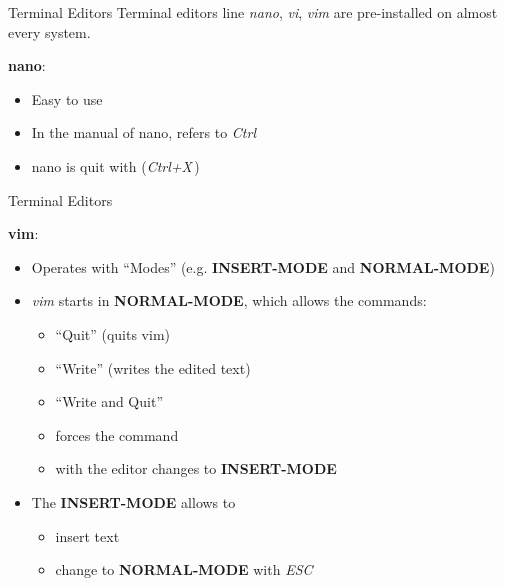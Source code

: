 \documentclass{setbeamer}
\begin{document}
\begin{frame}{Terminal Editors}
    Terminal editors line \emph{nano}, \emph{vi}, \emph{vim} are pre-installed on almost every system.

    \pause
    \vspace{0.3cm}

    \textbf{nano}:
    \begin{itemize}
        \item Easy to use
        \item In the manual of nano,  refers to \emph{Ctrl}
        \item nano is quit with  (\emph{Ctrl+X}\,) 
    \end{itemize}
\end{frame}

\begin{frame}{Terminal Editors}

    \textbf{vim}:
    \begin{itemize}
        \item Operates with ``Modes'' (e.g. \textbf{INSERT-MODE} and \textbf{NORMAL-MODE})
        \item \emph{vim} starts in \textbf{NORMAL-MODE}, which allows the commands:
            \begin{itemize}
                \item {}\textemdash ``Quit'' (quits vim)
                \item {}\textemdash ``Write'' (writes the edited text)
                \item {}\textemdash ``Write and Quit''
                \item {} forces the command
                \item with  the editor changes to \textbf{INSERT-MODE}
            \end{itemize}
        \item The \textbf{INSERT-MODE} allows to
            \begin{itemize}
            	\item insert text
                \item change to \textbf{NORMAL-MODE} with \emph{ESC} 
            \end{itemize}
    \end{itemize}
\end{frame}
\end{document}
